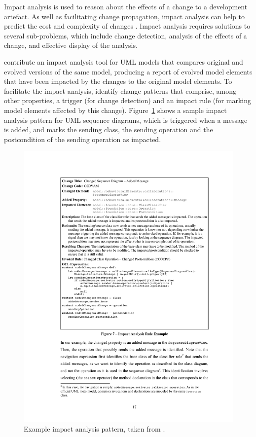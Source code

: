 Impact analysis is used to reason about the effects of a change to a development artefact. As well as facilitating change propagation, impact analysis can help to predict the cost and complexity of changes \cite{bohner02impactanalysis}. Impact analysis requires solutions to several sub-problems, which include change detection, analysis of the effects of a change, and effective display of the analysis.

\cite{briand03impactanalysis} contribute an impact analysis tool for UML models that compares original and evolved versions of the same model, producing a report of evolved model elements that have been impacted by the changes to the original model elements. To facilitate the impact analysis, \cite{briand03impactanalysis} identify change patterns that comprise, among other properties, a trigger (for change detection) and an impact rule (for marking model elements affected by this change). Figure~\ref{fig:impact_analysis_pattern} shows a sample impact analysis pattern for UML sequence diagrams, which is triggered when a message is added, and marks the sending class, the sending operation and the postcondition of the sending operation as impacted.

\begin{figure}[htbp]
  \begin{center}
    \leavevmode
    \includegraphics[width=12cm]{3.LiteratureReview/images/impact_analysis_pattern.pdf}
  \end{center}
  \caption[Example impact analysis pattern]{Example impact analysis pattern, taken from \cite{briand03impactanalysis}.}
  \label{fig:impact_analysis_pattern}
\end{figure}

